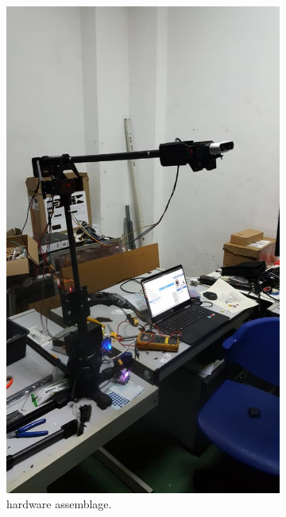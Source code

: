 \begin{figure}[h!]
  \centering
  \captionsetup{justification=centering}
  \begin{subfigure}{0.4\linewidth}
    \includegraphics[width=\linewidth]{r_mini_hardware.jpeg}
    \caption{\rimini hardware assemblage.}
  \end{subfigure}
  \begin{subfigure}{0.4\linewidth}

\end{subfigure}
\end{figure}
